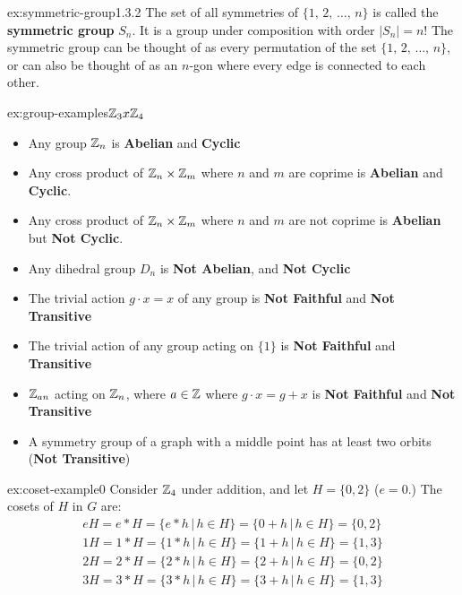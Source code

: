 \documentclass[landscape, 8pt]{extarticle}
\begin{document}
\begin{multicols}{3}
\begin{xmp}{ex:symmetric-group}{1.3.2}
The set of all symmetries of $\{1,\, 2,\,\dots,\,n\}$ is called the \textbf{symmetric group} $S_{n}$. It is a group under composition with order $\lvert S_{n}  \rvert = n!$ The symmetric group can be thought of as every permutation of the set $\{1,\, 2,\,\dots,\,n\}$, or can also be thought of as an $n$-gon where every edge is connected to each other. 
\end{xmp}
\vspace{-5pt}

\begin{xmp}{ex:group-examples}{$\mathbb{Z}_{3} x \mathbb{Z}_{4}$}
    \renewcommand\labelitemi{\tiny$\bullet$}
    \begin{itemize}
        \setlength\itemsep{0em}
        \item Any group $\mathbb{Z}_{n}$ is \textbf{Abelian} and \textbf{Cyclic}
        \item Any cross product of $\mathbb{Z}_{n} \times \mathbb{Z}_{m}$ where $n$ and $m$ are coprime is \textbf{Abelian} and \textbf{Cyclic}.
        \item Any cross product of $\mathbb{Z}_{n} \times \mathbb{Z}_{m}$ where $n$ and $m$ are not coprime is \textbf{Abelian} but \textbf{Not Cyclic}.
        \item Any dihedral group $D_{n}$ is \textbf{Not Abelian}, and \textbf{Not Cyclic}
        \item The trivial action $g\cdot x = x$ of any group is \textbf{Not Faithful} and \textbf{Not Transitive}
        \item The trivial action of any group acting on $\{1\}$ is \textbf{Not Faithful} and \textbf{Transitive}
        \item $\mathbb{Z}_{an}$ acting on $\mathbb{Z}_{n}$, where $a\in \mathbb{Z}$ where $g\cdot x=g+x$ is \textbf{Not Faithful} and \textbf{Not Transitive}
        \item A symmetry group of a graph with a middle point has at least two orbits (\textbf{Not Transitive})
    \end{itemize}
    \end{xmp}
    \vspace{-5pt}


\begin{xmp}{ex:coset-example}{0}
    Consider $\mathbb{Z}_{4}$ under addition, and let $H=\{0,2\}$ ($e=0$.) The cosets of $H$ in $G$ are:
    \[\begin{aligned}
    eH = e * H = \{e * h\,|\,h\in H\} = \{0+h\,|\, h\in H\} = \{0,2\} \\
    1H = 1 * H = \{1 * h\,|\,h\in H\} = \{1+h\,|\, h\in H\} = \{1,3\} \\
    2H = 2 * H = \{2 * h\,|\,h\in H\} = \{2+h\,|\, h\in H\} = \{0,2\} \\
    3H = 3 * H = \{3 * h\,|\,h\in H\} = \{3+h\,|\, h\in H\} = \{1,3\}
    \end{aligned}\]


\end{xmp}
\end{multicols}
\end{document}
